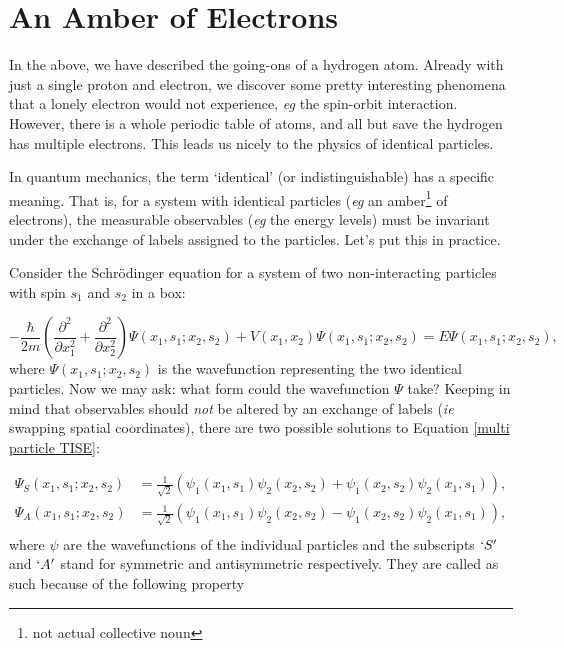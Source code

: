 \documentclass{article}
\numberwithin{equation}{section} %
\begin{document}
\section{An Amber of Electrons}
In the above, we have described the going-ons of a hydrogen atom. Already with just a single proton and electron, we discover some pretty interesting phenomena that a lonely electron would not experience, \textit{eg} the spin-orbit interaction. However, there is a whole periodic table of atoms, and all but save the hydrogen has multiple electrons. This leads us nicely to the physics of identical particles.

In quantum mechanics, the term `identical' (or indistinguishable) has a specific meaning. That is, for a system with identical particles (\textit{eg} an amber\footnote{not actual collective noun} of electrons), the measurable observables (\textit{eg} the energy levels) must be invariant under the exchange of labels assigned to the particles. Let's put this in practice. 

Consider the Schr\"odinger equation for a system of two non-interacting particles with spin $s_1$ and $s_2$ in a box:

\begin{equation}
-\frac{\hbar}{2m}\left( \frac{\partial^2}{\partial x_1^2} + \frac{\partial^2 }{\partial x_2^2}\right)\Psi(x_1,s_1;x_2,s_2) + V(x_1,x_2)\Psi(x_1,s_1;x_2,s_2) = E\Psi(x_1,s_1;x_2,s_2),
\label{multi particle TISE}
\end{equation}
where $\Psi(x_1,s_1;x_2,s_2)$ is the wavefunction representing the two identical particles. Now we may ask: what form could the wavefunction $\Psi$ take? Keeping in mind that observables should \textit{not} be altered by an exchange of labels (\textit{ie} swapping spatial coordinates), there are two possible solutions to Equation \ref{multi particle TISE}:

\begin{equation}
\begin{split}
\Psi_S(x_1,s_1;x_2,s_2) &= \frac{1}{\sqrt{2}} \left( \psi_{1}(x_1,s_1)\psi_{2}(x_2,s_2) + \psi_{1}(x_2,s_2)\psi_{2}(x_1,s_1)\right),\\
\Psi_A(x_1,s_1;x_2,s_2) &=\frac{1}{\sqrt{2}} \left( \psi_{1}(x_1,s_1)\psi_{2}(x_2,s_2) - \psi_{1}(x_2,s_2)\psi_{2}(x_1,s_1)\right),\\
\end{split} 
\end{equation}
where $\psi$ are the wavefunctions of the individual particles and the subscripts $`S'$ and $`A'$ stand for symmetric and antisymmetric respectively. They are called as such because of the following property
\end{document}

